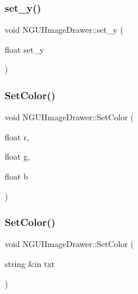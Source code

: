 \hypertarget{class_n_g_u_i_image_drawer_a9e9e719a770478eef692d6feacafef3c}{}\label{class_n_g_u_i_image_drawer_a9e9e719a770478eef692d6feacafef3c} 
\subsubsection{\texorpdfstring{set\+\_\+y()}{set\_y()}}
{\footnotesize\ttfamily void N\+G\+U\+I\+Image\+Drawer\+::set\+\_\+y (\begin{DoxyParamCaption}\item[{float}]{set\+\_\+y }\end{DoxyParamCaption})}

\hypertarget{class_n_g_u_i_image_drawer_a0635b29dbe5074b9da8226b60fcd04b8}{}\label{class_n_g_u_i_image_drawer_a0635b29dbe5074b9da8226b60fcd04b8} 
\subsubsection{\texorpdfstring{Set\+Color()}{SetColor()}\hspace{0.1cm}{\footnotesize\ttfamily [1/2]}}
{\footnotesize\ttfamily void N\+G\+U\+I\+Image\+Drawer\+::\+Set\+Color (\begin{DoxyParamCaption}\item[{float}]{r,  }\item[{float}]{g,  }\item[{float}]{b }\end{DoxyParamCaption})}

\hypertarget{class_n_g_u_i_image_drawer_aea5e2dd2c4fd11496f3490b3c4e146d7}{}\label{class_n_g_u_i_image_drawer_aea5e2dd2c4fd11496f3490b3c4e146d7} 
\subsubsection{\texorpdfstring{Set\+Color()}{SetColor()}\hspace{0.1cm}{\footnotesize\ttfamily [2/2]}}
{\footnotesize\ttfamily void N\+G\+U\+I\+Image\+Drawer\+::\+Set\+Color (\begin{DoxyParamCaption}\item[{string \&in}]{txt }\end{DoxyParamCaption})}

